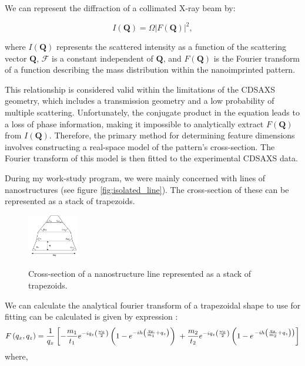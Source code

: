 \medskip
We can represent the diffraction of a collimated X-ray beam by:

\begin{equation}
    I(\mathbf{Q}) = \varOmega | F(\mathbf{Q}) |^2,
\end{equation}
    
where $I(\mathbf{Q})$ represents the scattered intensity as a function of the scattering
vector $\mathbf{Q}$, $\mathcal{F}$ is a constant independent of $\mathbf{Q}$,
and $F(\mathbf{Q})$ is the Fourier transform of a function describing the mass
distribution within the nanoimprinted pattern. 
    
This relationship is considered valid within the limitations of the CDSAXS geometry,
which includes a transmission geometry and a low probability of multiple scattering.    
Unfortunately, the conjugate product in the equation leads to a loss of phase
information, making it impossible to analytically extract $F(\mathbf{Q})$ from $I(\mathbf{Q})$.
Therefore, the primary method for determining feature dimensions involves constructing
a real-space model of the pattern's cross-section. The Fourier transform of this 
model is then fitted to the experimental CDSAXS data.

\medskip

During my work-study program, we were mainly concerned with lines of nanostructures (see figure \ref{fig:isolated_line}). The cross-section of
these can be represented as a stack of trapezoids.
\begin{figure}[h]
    \centering
    \includegraphics[width=0.2\textwidth]{images/trapezoid.png}
    \label{fig:trapezoid_model}
    \caption{Cross-section of a nanostructure line represented as a stack of trapezoids.}
    
\end{figure}
We can calculate the analytical fourier transform of a trapezoidal shape to use for fitting
can be calculated is given by expression \cite{sunday_2015}:
\begin{equation}
    F\left(q_{x}, q_{z}\right)=\frac{1}{q_{x}}\left[-\frac{m_{1}}{t_{1}} e^{-i q_{x}\left(\frac{\omega_{0}}{2}\right)}\left(1-e^{-i h\left(\frac{q_{x}}{m_{1}}+q_{z}\right)}\right)\right. \\ +\frac{m_{2}}{t_{2}} e^{-i q_{x}\left(\frac{\omega_{0}}{2}\right)}\left(1-e^{\left.-i h\left(\frac{q_{x}}{m_{2}}+q_{z}\right)\right)}\right]
    \label{eq:trapezoidal_ft}
\end{equation}
where,

